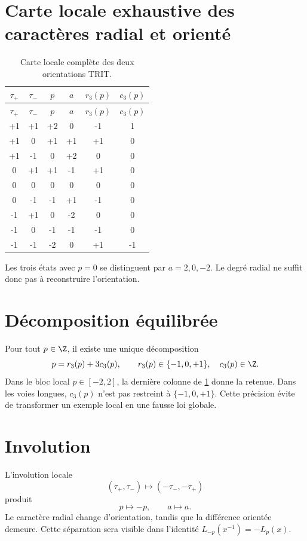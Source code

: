 \section{Carte locale exhaustive des caractères radial et orienté}

\begin{longtable}{cccccc}
\caption{Carte locale complète des deux orientations TRIT.}
\label{espiral:tab:doble-trit}\\
\toprule
\(\tau_+\)&\(\tau_-\)&\(p\)&\(a\)&\(r_3(p)\)&\(c_3(p)\)\\
\midrule
\endfirsthead
\toprule
\(\tau_+\)&\(\tau_-\)&\(p\)&\(a\)&\(r_3(p)\)&\(c_3(p)\)\\
\midrule
\endhead
+1&+1&+2&0&-1&1\\
+1&0&+1&+1&+1&0\\
+1&-1&0&+2&0&0\\
0&+1&+1&-1&+1&0\\
0&0&0&0&0&0\\
0&-1&-1&+1&-1&0\\
-1&+1&0&-2&0&0\\
-1&0&-1&-1&-1&0\\
-1&-1&-2&0&+1&-1\\
\bottomrule
\end{longtable}

Les trois états avec \(p=0\) se distinguent par \(a=2,0,-2\). Le degré radial ne suffit donc pas à reconstruire l'orientation.

\section{Décomposition équilibrée}

Pour tout \(p\in\Z\), il existe une unique décomposition
\[
 p=r_3(p)+3c_3(p),
 \qquad r_3(p)\in\{-1,0,+1\},\quad c_3(p)\in\Z.
\]
Dans le bloc local \(p\in[-2,2]\), la dernière colonne de \cref{espiral:tab:doble-trit} donne la retenue. Dans les voies longues, \(c_3(p)\) n'est pas restreint à \(\{-1,0,+1\}\). Cette précision évite de transformer un exemple local en une fausse loi globale.

\section{Involution}

L'involution locale
\[
 (\tau_+,\tau_-)\longmapsto(-\tau_-,-\tau_+)
\]
produit
\[
 p\longmapsto-p,
 \qquad
 a\longmapsto a.
\]
Le caractère radial change d'orientation, tandis que la différence orientée demeure. Cette séparation sera visible dans l'identité \(L_{-p}(x^{-1})=-L_p(x)\).

